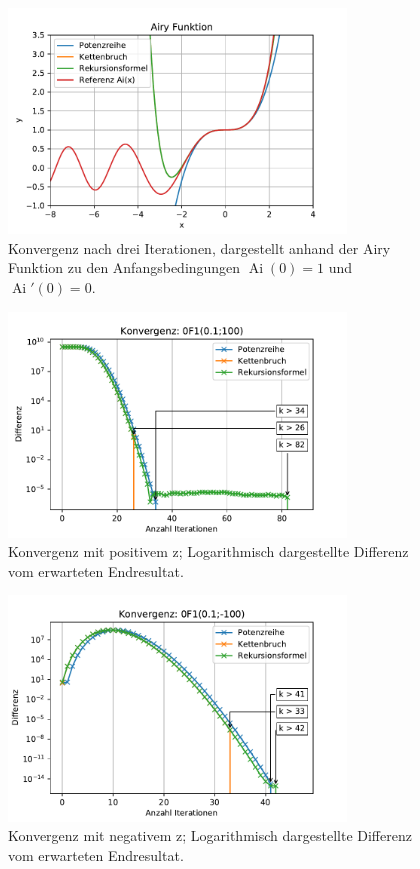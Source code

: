 \begin{figure}
    \centering
    \includegraphics[width=0.8\textwidth]{papers/0f1/images/konvergenzAiry.pdf}
    \caption{Konvergenz nach drei Iterationen, dargestellt anhand der Airy Funktion zu den Anfangsbedingungen $\operatorname{Ai}(0)=1$ und $\operatorname{Ai}'(0)=0$.
    \label{0f1:ausblick:plot:airy:konvergenz}}
\end{figure}

\begin{figure}
    \centering
    \includegraphics[width=0.8\textwidth]{papers/0f1/images/konvergenzPositiv.pdf}
    \caption{Konvergenz mit positivem z; Logarithmisch dargestellte Differenz vom erwarteten Endresultat.
    \label{0f1:ausblick:plot:konvergenz:positiv}}
\end{figure}

\begin{figure}
    \centering
    \includegraphics[width=0.8\textwidth]{papers/0f1/images/konvergenzNegativ.pdf}
    \caption{Konvergenz mit negativem z; Logarithmisch dargestellte Differenz vom erwarteten Endresultat.
    \label{0f1:ausblick:plot:konvergenz:negativ}}
\end{figure}

